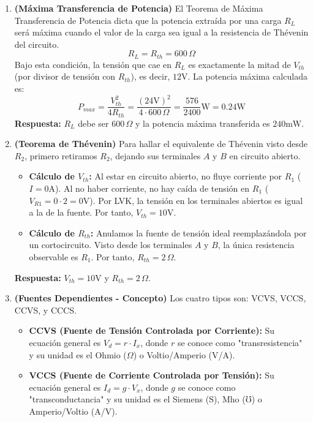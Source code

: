 \documentclass[12pt, a4paper]{article}
\begin{document}
\begin{enumerate}[leftmargin=*, itemsep=2em]
    \item \textbf{(Máxima Transferencia de Potencia)}
    El Teorema de Máxima Transferencia de Potencia dicta que la potencia extraída por una carga $R_L$ será máxima cuando el valor de la carga sea igual a la resistencia de Thévenin del circuito. 
    $$R_L = R_{th} = 600\,\Omega$$
    Bajo esta condición, la tensión que cae en $R_L$ es exactamente la mitad de $V_{th}$ (por divisor de tensión con $R_{th}$), es decir, $12\text{V}$.
    La potencia máxima calculada es:
    $$P_{max} = \frac{V_{th}^2}{4 R_{th}} = \frac{(24\text{V})^2}{4 \cdot 600\,\Omega} = \frac{576}{2400}\text{W} = 0.24\text{W}$$
    \textbf{Respuesta:} $R_L$ debe ser $600\,\Omega$ y la potencia máxima transferida es $240\text{mW}$.

    \item \textbf{(Teorema de Thévenin)}
    Para hallar el equivalente de Thévenin visto desde $R_2$, primero retiramos $R_2$, dejando sus terminales $A$ y $B$ en circuito abierto.
    \begin{itemize}
        \item \textbf{Cálculo de $V_{th}$:} Al estar en circuito abierto, no fluye corriente por $R_1$ ($I = 0\text{A}$). Al no haber corriente, no hay caída de tensión en $R_1$ ($V_{R1} = 0 \cdot 2 = 0\text{V}$). Por LVK, la tensión en los terminales abiertos es igual a la de la fuente. Por tanto, $V_{th} = 10\text{V}$.
        \item \textbf{Cálculo de $R_{th}$:} Anulamos la fuente de tensión ideal reemplazándola por un cortocircuito. Visto desde los terminales $A$ y $B$, la única resistencia observable es $R_1$. Por tanto, $R_{th} = 2\,\Omega$.
    \end{itemize}
    \textbf{Respuesta:} $V_{th} = 10\text{V}$ y $R_{th} = 2\,\Omega$.

    \item \textbf{(Fuentes Dependientes - Concepto)}
    Los cuatro tipos son: VCVS, VCCS, CCVS, y CCCS.
    \begin{itemize}
        \item \textbf{CCVS (Fuente de Tensión Controlada por Corriente):} Su ecuación general es $V_d = r \cdot I_x$, donde $r$ se conoce como "transresistencia" y su unidad es el Ohmio ($\Omega$) o Voltio/Amperio (V/A).
        \item \textbf{VCCS (Fuente de Corriente Controlada por Tensión):} Su ecuación general es $I_d = g \cdot V_x$, donde $g$ se conoce como "transconductancia" y su unidad es el Siemens (S), Mho ($\mho$) o Amperio/Voltio (A/V).
    \end{itemize}


\end{enumerate}
\end{document}
